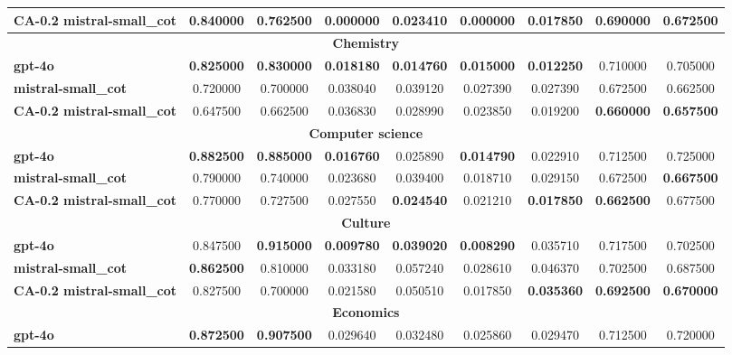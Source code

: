 {\begin{longtable}{|l|cc|cc|cc|cc|}
\multicolumn{1}{|l|}{\textbf{CA-0.2 mistral-small\_cot}} & 0.840000 & 0.762500 & \textbf{0.000000} & 0.023410 & \textbf{0.000000} & \textbf{0.017850} & 0.690000 & 0.672500 \\
\hline
\multicolumn{9}{|c|}{\textbf{Chemistry}} \\
\hline
\multicolumn{1}{|l|}{\textbf{gpt-4o}} & \textbf{0.825000} & \textbf{0.830000} & \textbf{0.018180} & \textbf{0.014760} & \textbf{0.015000} & \textbf{0.012250} & 0.710000 & 0.705000 \\
\multicolumn{1}{|l|}{\textbf{mistral-small\_cot}} & 0.720000 & 0.700000 & 0.038040 & 0.039120 & 0.027390 & 0.027390 & 0.672500 & 0.662500 \\
\multicolumn{1}{|l|}{\textbf{CA-0.2 mistral-small\_cot}} & 0.647500 & 0.662500 & 0.036830 & 0.028990 & 0.023850 & 0.019200 & \textbf{0.660000} & \textbf{0.657500} \\
\hline
\multicolumn{9}{|c|}{\textbf{Computer science}} \\
\hline
\multicolumn{1}{|l|}{\textbf{gpt-4o}} & \textbf{0.882500} & \textbf{0.885000} & \textbf{0.016760} & 0.025890 & \textbf{0.014790} & 0.022910 & 0.712500 & 0.725000 \\
\multicolumn{1}{|l|}{\textbf{mistral-small\_cot}} & 0.790000 & 0.740000 & 0.023680 & 0.039400 & 0.018710 & 0.029150 & 0.672500 & \textbf{0.667500} \\
\multicolumn{1}{|l|}{\textbf{CA-0.2 mistral-small\_cot}} & 0.770000 & 0.727500 & 0.027550 & \textbf{0.024540} & 0.021210 & \textbf{0.017850} & \textbf{0.662500} & 0.677500 \\
\hline
\multicolumn{9}{|c|}{\textbf{Culture}} \\
\hline
\multicolumn{1}{|l|}{\textbf{gpt-4o}} & 0.847500 & \textbf{0.915000} & \textbf{0.009780} & \textbf{0.039020} & \textbf{0.008290} & 0.035710 & 0.717500 & 0.702500 \\
\multicolumn{1}{|l|}{\textbf{mistral-small\_cot}} & \textbf{0.862500} & 0.810000 & 0.033180 & 0.057240 & 0.028610 & 0.046370 & 0.702500 & 0.687500 \\
\multicolumn{1}{|l|}{\textbf{CA-0.2 mistral-small\_cot}} & 0.827500 & 0.700000 & 0.021580 & 0.050510 & 0.017850 & \textbf{0.035360} & \textbf{0.692500} & \textbf{0.670000} \\
\hline
\multicolumn{9}{|c|}{\textbf{Economics}} \\
\hline
\multicolumn{1}{|l|}{\textbf{gpt-4o}} & \textbf{0.872500} & \textbf{0.907500} & 0.029640 & 0.032480 & 0.025860 & 0.029470 & 0.712500 & 0.720000 \\

\end{longtable}}

